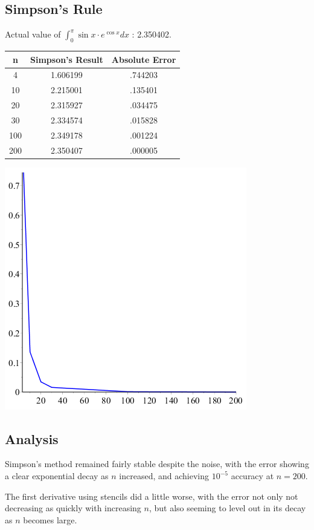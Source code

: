 \documentclass[11pt]{article} %
\begin{document}
\subsection*{Simpson's Rule}
Actual value of $\int_{0}^{\pi} \sin x \cdot e^{\cos x} dx$ : 2.350402.

\begin{tabular}{c | c | c }
n & Simpson's Result & Absolute Error \\
\hline
4 & 1.606199 & .744203 \\
10 & 2.215001 & .135401 \\
20 & 2.315927&  .034475\\
30 & 2.334574&  .015828\\
100 & 2.349178 & .001224 \\
200 & 2.350407 & .000005 \\
\end{tabular}

\includegraphics[scale=.5]{plots/problem2simpsonplot.png}
\subsection*{Analysis}
Simpson's method remained fairly stable despite the noise, with the error showing a clear exponential decay as $n$ increased,
and achieving $10^{-5}$ accuracy at $n=200$.

The first derivative using stencils did a little worse, with the error not only not decreasing as quickly with increasing $n$, but also seeming to level out in its decay as $n$ becomes large.
\end{document}

